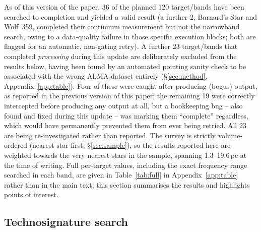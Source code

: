 \documentclass{openjournal}
\begin{document}
As of this version of the paper, 36 of the planned 120 target/bands have
been searched to completion and yielded a valid result (a further 2,
Barnard's Star and Wolf~359, completed their continuum measurement but
not the narrowband search, owing to a data-quality failure in those
specific execution blocks; both are flagged for an automatic, non-gating
retry). A further 23 target/bands that completed \emph{processing} during
this update are deliberately excluded from the results below, having
been found by an automated pointing sanity check to be associated with
the wrong ALMA dataset entirely (\S\ref{sec:method},
Appendix~\ref{app:table}). Four of these were caught after producing
(bogus) output, as reported in the previous version of this paper; the
remaining 19 were correctly intercepted before producing any output at
all, but a bookkeeping bug -- also found and fixed during this update --
was marking them ``complete'' regardless, which would have permanently
prevented them from ever being retried. All 23 are being re-investigated
rather than reported. The survey is strictly volume-ordered (nearest
star first; \S\ref{sec:sample}), so the results reported here are
weighted towards the very nearest stars in the sample, spanning
1.3--19.6\,pc at the time of writing. Full per-target values, including
the exact frequency range searched in each band, are given in
Table~\ref{tab:full} in Appendix~\ref{app:table} rather than in the main
text; this section summarises the results and highlights points of
interest.

\subsection{Technosignature search}
\end{document}
